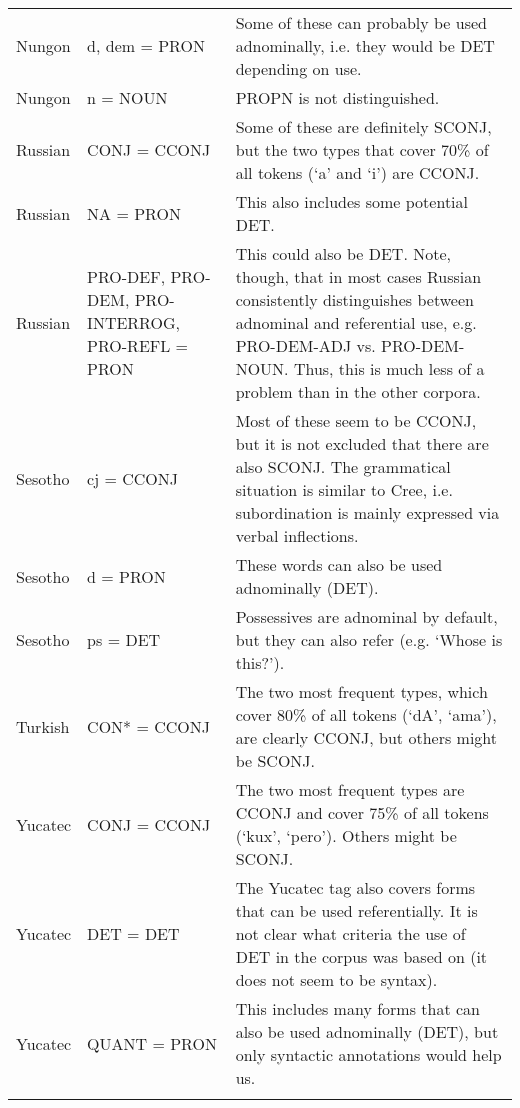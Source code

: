\documentclass[a4paper, 11pt]{book}
\begin{document}
\begin{longtable}{lp{.2\linewidth}p{.5\linewidth}}
		Nungon                    & d, dem = PRON             & Some of these can probably be used adnominally, i.e. they would be DET depending on use. \\ 
		Nungon                    & n = NOUN                  & PROPN is not distinguished. \\
		Russian                   & CONJ = CCONJ              & Some of these are definitely SCONJ, but the two types that cover 70\% of all tokens (`a' and `i') are CCONJ. \\
		Russian                   & NA = PRON                 & This also includes some potential DET. \\
		Russian                   & PRO-DEF, PRO-DEM, \hspace{2cm} PRO-INTERROG, PRO-REFL = PRON & This could also be DET. Note, though, that in most cases Russian consistently distinguishes between adnominal and referential use, e.g. PRO-DEM-ADJ vs. PRO-DEM-NOUN. Thus, this is much less of a problem than in the other corpora. \\
		Sesotho                   & cj = CCONJ                & Most of these seem to be CCONJ, but it is not excluded that there are also SCONJ. The grammatical situation is similar to Cree, i.e. subordination is mainly expressed via verbal inflections. \\
		Sesotho                   & d = PRON                  & These words can also be used adnominally (DET). \\
		Sesotho                   & ps = DET                  & Possessives are adnominal by default, but they can also refer (e.g. `Whose is this?'). \\
		Turkish                   & CON* = CCONJ              & The two most frequent types, which cover 80\% of all tokens (`dA', `ama'), are clearly CCONJ, but others might be SCONJ. \\
		Yucatec                   & CONJ = CCONJ              & The two most frequent types are CCONJ and cover 75\% of all tokens (`kux', `pero'). Others might be SCONJ. \\
		Yucatec                   & DET = DET                 & The Yucatec tag also covers forms that can be used referentially. It is not clear what criteria the use of DET in the corpus was based on (it does not seem to be syntax). \\
		Yucatec                   & QUANT = PRON              & This includes many forms that can also be used adnominally (DET), but only syntactic annotations would help us. \\
		\label{tab:mapping-raw-UD}
\end{longtable}
\end{document}
